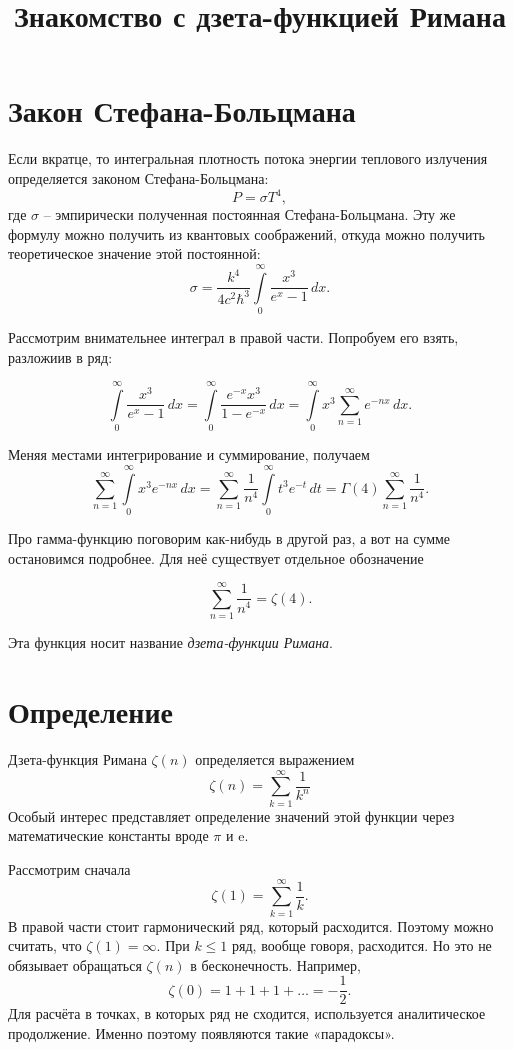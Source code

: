

\title{Знакомство с дзета-функцией Римана}


\maketitle
\tableofcontents
\section{Закон Стефана-Больцмана}

Если вкратце, то интегральная плотность потока энергии теплового излучения определяется законом Стефана-Больцмана:
\[
    P = \sigma T^4,
\]
где \( \sigma \) -- эмпирически полученная постоянная Стефана-Больцмана.
Эту же формулу можно получить из квантовых соображений, откуда можно получить теоретическое значение этой постоянной:
\[
    \sigma = \frac{k^4}{4 c^2\hbar^3}\int\limits_0^\infty\frac{x^3}{e^x-1}\,dx.
\]

Рассмотрим внимательнее интеграл в правой части. Попробуем его взять, разложиив в ряд:

\[
    \int\limits_0^\infty\frac{x^3}{e^x-1}\,dx = \int\limits_0^\infty\frac{e^{-x}x^3}{1-e^{-x}}\,dx = \int\limits_0^\infty x^3 \sum\limits_{n=1}^\infty e^{-nx}\,dx.
\]

Меняя местами интегрирование и суммирование, получаем
\[
    \sum\limits_{n=1}^\infty \int\limits_0^\infty x^3  e^{-nx}\,dx = \sum\limits_{n=1}^\infty\frac{1}{n^4} \int\limits_0^\infty t^3  e^{-t}\,dt =
    \Gamma(4)\sum\limits_{n=1}^\infty\frac{1}{n^4}.
\]

Про гамма-функцию поговорим как-нибудь в другой раз, а вот на сумме остановимся подробнее. Для неё существует отдельное обозначение

\[
    \sum\limits_{n=1}^\infty\frac{1}{n^4} = \zeta(4).
\]

Эта функция носит название \emph{дзета-функции Римана}.

\section{Определение}
Дзета-функция Римана \( \zeta(n) \) определяется выражением
\[
    \zeta(n) = \sum\limits_{k=1}^\infty \frac{1}{k^n}
\]
Особый интерес представляет определение значений этой функции через математические константы вроде \(\pi\) и \(\mathrm{e}\).

Рассмотрим сначала
\[
    \zeta(1) = \sum\limits_{k=1}^\infty \frac{1}{k}.
\]
В правой части стоит гармонический ряд, который расходится. Поэтому можно считать, что \( \zeta(1) = \infty \). При \( k \le 1 \) ряд, вообще говоря, расходится. Но это не обязывает обращаться \( \zeta(n) \) в бесконечность. Например,
\[
    \zeta(0) = 1 + 1 + 1 + \ldots = -\frac{1}{2}.
\]
Для расчёта в точках, в которых ряд не сходится, используется аналитическое продолжение. Именно поэтому появляются такие «парадоксы».

